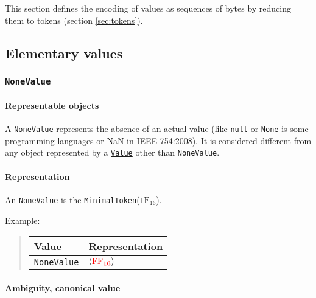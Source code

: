 \documentclass{dbor-article}
\newcommand{\HexNumber}[1]{\mathrm{#1}_{16}}
\newcommand{\DborSyntaxIdent}[1]{\texttt{#1}}
\newcommand{\DborSyntaxIdentRef}[1]{\hyperlink{sec:def:#1}{\DborSyntaxIdent{#1}}}
\newcommand{\DborFirstByte}[2]{\mathbf{\textcolor{#1}{\HexNumber{#2}}}}
\newcommand{\DborFirstByteNone}[1]{\DborFirstByte{red}{#1}}
\begin{document}
    This section defines the encoding of values as sequences of bytes by reducing them to tokens
    (section \ref{sec:tokens}).


    \subsection{Elementary values}

    \subsubsection{\DborSyntaxIdent{NoneValue}}
    \label{sec:def:NoneValue}
    \hypertarget{sec:def:NoneValue}{}

    \paragraph{Representable objects}

    A \DborSyntaxIdent{NoneValue} represents the absence of an actual value (like \texttt{null} or \texttt{None} is some
    programming languages or NaN in IEEE-754:2008).
    It is considered different from any object represented by a \DborSyntaxIdentRef{Value} other than
    \DborSyntaxIdent{NoneValue}.

    \paragraph{Representation}

    An \DborSyntaxIdent{NoneValue} is the \DborSyntaxIdentRef{MinimalToken}($\HexNumber{1F}$).

    \smallskip
    \noindent
    Example:
    \nolinebreak
    \begin{quote}    
        \begin{tabular}{ll}
            \toprule
            Value & Representation \\
            \midrule
            \DborSyntaxIdent{NoneValue} 
                & $\langle \DborFirstByteNone{FF} \rangle$ \\
            \bottomrule
        \end{tabular}
    \end{quote}

    \paragraph{Ambiguity, canonical value}
\end{document}
